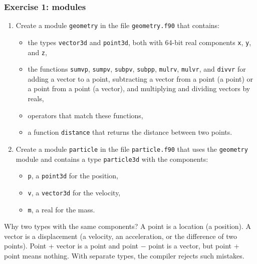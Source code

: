 \begin{frame}
  \frametitle{Exercise 1: modules}
  \begin{enumerate}
    \item Create a module \texttt{geometry} in the file \texttt{geometry.f90} that contains:
      \begin{itemize}
        \item the types \texttt{vector3d} and \texttt{point3d}, both with 64-bit real components \texttt{x}, \texttt{y}, and \texttt{z},
        \item the functions \texttt{sumvp}, \texttt{sumpv}, \texttt{subpv}, \texttt{subpp}, \texttt{mulrv}, \texttt{mulvr}, and \texttt{divvr} for adding a vector to a point, subtracting a vector from a point (a point) or a point from a point (a vector), and multiplying and dividing vectors by reals,
        \item operators that match these functions,
        \item a function \texttt{distance} that returns the distance between two points.
      \end{itemize}
    \item Create a module \texttt{particle} in the file \texttt{particle.f90} that uses the \texttt{geometry} module and contains a type \texttt{particle3d} with the components:
      \begin{itemize}
        \item \texttt{p}, a \texttt{point3d} for the position,
        \item \texttt{v}, a \texttt{vector3d} for the velocity,
        \item \texttt{m}, a real for the mass.
      \end{itemize}
  \end{enumerate}

  \begin{block}{Why two types with the same components?}
    A point is a location (a position). A vector is a displacement (a velocity, an acceleration, or the difference of two points). Point + vector is a point and point $-$ point is a vector, but point + point means nothing. With separate types, the compiler rejects such mistakes.
  \end{block}
\end{frame}



